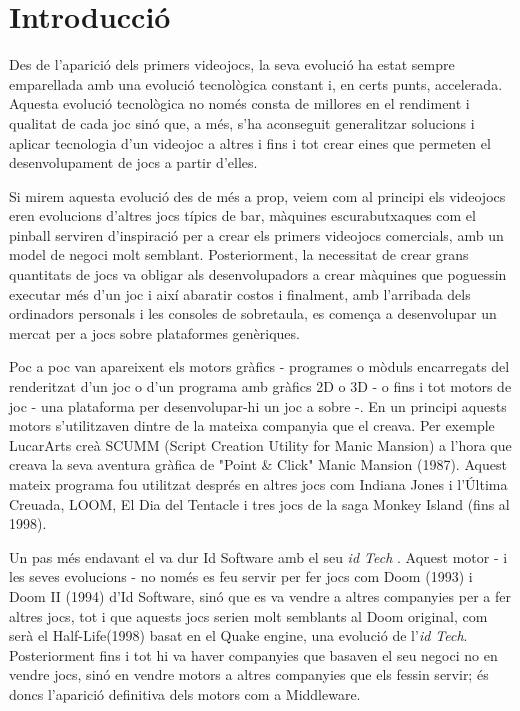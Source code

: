 \chapter{Introducció}

Des de l'aparició dels primers videojocs, la seva evolució ha estat sempre emparellada amb una evolució tecnològica constant i, en certs punts, accelerada. Aquesta evolució tecnològica no només consta de millores en el rendiment i qualitat de cada joc sinó que, a més, s'ha aconseguit generalitzar solucions i aplicar tecnologia d'un videojoc a altres i fins i tot crear eines que permeten el desenvolupament de jocs a partir d'elles.

Si mirem aquesta evolució des de més a prop, veiem com al principi els videojocs eren evolucions d'altres jocs típics de bar, màquines escurabutxaques com el pinball serviren d'inspiració per a crear els primers videojocs comercials, amb un model de negoci molt semblant. Posteriorment, la necessitat de crear grans quantitats de jocs va obligar als desenvolupadors a crear màquines que poguessin executar més d'un joc i així abaratir costos i finalment, amb l'arribada dels ordinadors personals i les consoles de sobretaula, es comença a desenvolupar un mercat per a jocs sobre plataformes genèriques.

Poc a poc van apareixent els motors gràfics - programes o mòduls encarregats del renderitzat d'un joc o d'un programa amb gràfics 2D o 3D - o fins i tot motors de joc - una plataforma per desenvolupar-hi un joc a sobre -. En un principi aquests motors s'utilitzaven dintre de la mateixa companyia que el creava. Per exemple LucarArts creà {SCUMM} ({Script Creation Utility for Manic Mansion}) \citep{WikiScumm} a l'hora que creava la seva aventura gràfica de "Point \& Click" Manic Mansion (1987). Aquest mateix programa fou utilitzat després en altres jocs com Indiana Jones i l'Última Creuada, LOOM, El Dia del Tentacle i tres jocs de la saga Monkey Island (fins al 1998).

Un pas més endavant el va dur Id Software amb el seu {\em id Tech}  \citep{WikiScumm}. Aquest motor - i les seves evolucions - no només es feu servir per fer jocs com Doom (1993) i Doom II (1994) d'Id Software, sinó que es va vendre a altres companyies per a fer altres jocs, tot i que aquests jocs serien molt semblants al Doom original, com serà el Half-Life(1998) basat en el Quake engine, una evolució de l'{\em id Tech}. Posteriorment fins i tot hi va haver companyies que basaven el seu negoci no en vendre jocs, sinó en vendre motors a altres companyies que els fessin servir; és doncs l'aparició definitiva dels motors com a Middleware.

